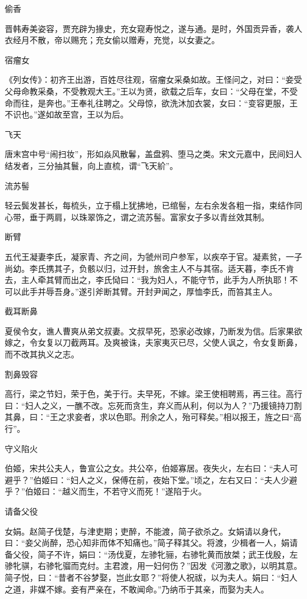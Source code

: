\documentclass[a4paper,12pt,UTF8,twoside]{ctexbook}
\begin{document}
    偷香
    
    晋韩寿美姿容，贾充辟为掾史，充女窥寿悦之，遂与通。是时，外国贡异香，袭人衣经月不散，帝以赐充；充女偷以赠寿，充觉，以女妻之。
    
    宿瘤女
    
    《列女传》：初齐王出游，百姓尽往观，宿瘤女采桑如故。王怪问之，对曰：“妾受父母命教采桑，不受教观大王。”王以为贤，欲载之后车，女曰：“父母在堂，不受命而往，是奔也。”王奉礼往聘之。父母惊，欲洗沐加衣裳，女曰：“变容更服，王不识也。”遂如故至宫，王以为后。
    
    飞天
    
    唐末宫中号“闹扫妆”，形如焱风散鬊，盖盘鸦、堕马之类。宋文元嘉中，民间妇人结发者，三分抽其鬟，向上直梳，谓“飞天紒”。
    
    流苏髻
    
    轻云鬓发甚长，每梳头，立于榻上犹拂地，已绾髻，左右余发各粗一指，束结作同心带，垂于两肩，以珠翠饰之，谓之流苏髻。富家女子多以青丝效其制。
    
    断臂
    
    五代王凝妻李氏，凝家青、齐之间，为虢州司户参军，以疾卒于官。凝素贫，一子尚幼。李氏携其子，负骸以归，过开封，旅舍主人不与其宿。适天暮，李氏不肯去，主人牵其臂而出之，李氏恸曰：“我为妇人，不能守节，此手为人所执耶！不可以此手并辱吾身。”遂引斧断其臂。开封尹闻之，厚恤李氏，而笞其主人。
    
    截耳断鼻
    
    夏侯令女，谯人曹爽从弟文叔妻。文叔早死，恐家必改嫁，乃断发为信。后家果欲嫁之，令女复以刀截两耳。及爽被诛，夫家夷灭已尽，父使人讽之，令女复断鼻，而不改其执义之志。
    
    割鼻毁容
    
    高行，梁之节妇，荣于色，美于行。夫早死，不嫁。梁王使相聘焉，再三往。高行曰：“妇人之义，一醮不改。忘死而贪生，弃义而从利，何以为人？”乃援镜持刀割其鼻，曰：“王之求妾者，求以色耶。刑余之人，殆可释矣。”相以报王，旌之曰“高行”。
    
    守义陷火
    
    伯姬，宋共公夫人，鲁宣公之女。共公卒，伯姬寡居。夜失火，左右曰：“夫人可避乎？”伯姬曰：“妇人之义，保傅在前，夜始下堂。”顷之，左右又曰：“夫人少避乎？”伯姬曰：“越义而生，不若守义而死！”遂陷于火。
    
    请备父役
    
    女娟。赵简子伐楚，与津吏期；吏醉，不能渡，简子欲杀之。女娟请以身代，曰：“妾父尚醉，恐心知非而体不知痛也。”简子释其父。将渡，少楫者一人，娟请备父役，简子不许，娟曰：“汤伐夏，左骖牝骊，右骖牝黄而放桀；武王伐殷，左骖牝骐，右骖牝骝而克纣。主君渡，用一妇何伤？”因发《河激之歌》，以明其意。简子悦，曰：“昔者不谷梦娶，岂此女耶？”将使人祝祓，以为夫人。娟曰：“妇人之道，非媒不嫁。妾有严亲在，不敢闻命。”乃纳币于其亲，而娶为夫人。
    
\end{document}
